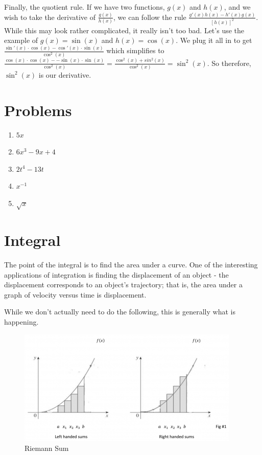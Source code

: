 \documentclass{memoir}
\begin{document}
Finally, the quotient rule. 
If we have two functions, $g(x)$ and $h(x)$, and we wish to take the derivative of $\frac{g(x)}{h(x)}$, we can follow the rule $\frac{g'(x)h(x)-h'(x)g(x)}{[h(x)]^2}$. 
While this may look rather complicated, it really isn't too bad. 
Let's use the example of $g(x) = \sin(x)$ and $h(x) = \cos(x)$. 
We plug it all in to get $\frac{\sin'(x)\cdot\cos(x) -\cos'(x)\cdot\sin(x)}{\cos^2(x)}$
which simplifies to $\frac{\cos(x)\cdot\cos(x)--\sin(x)\cdot\sin(x)}{\cos^2(x)} = \frac{\cos^2(x)+sin^2(x)}{\cos^2(x)} = \sin^2(x)$. 
So therefore, $\sin^2(x)$ is our derivative.
\section{Problems}
\begin{enumerate}
    \item $5x$
    \item $6x^3 - 9x + 4$
    \item $2t^4 - 13t$
    \item $x^{-1}$
    \item $\sqrt{x}$
\end{enumerate}

\section{Integral}

The point of the integral is to find the area under a curve. 
One of the interesting applications of integration is finding the displacement of an object - the displacement corresponds to an object's trajectory; that is, the area under a graph of velocity versus time is displacement.

While we don't actually need to do the following, this is generally what is happening. 

\begin{centering}
\begin{figure}[H]
\caption{Riemann Sum}
\includegraphics[scale=0.8]{../rieman.jpg}
\end{figure}
\end{centering}
\end{document}

